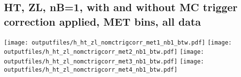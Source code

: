 \documentclass[11pt]{article}
\begin{document}














     \subsection{ HT, ZL, nB=1, with and without MC trigger correction applied, MET bins, all data}

    \noindent
     \texttt{[image: outputfiles/h\_ht\_zl\_nomctrigcorr\_met1\_nb1\_btw.pdf]}
     \texttt{[image: outputfiles/h\_ht\_zl\_nomctrigcorr\_met2\_nb1\_btw.pdf]}
     \texttt{[image: outputfiles/h\_ht\_zl\_nomctrigcorr\_met3\_nb1\_btw.pdf]}
     \texttt{[image: outputfiles/h\_ht\_zl\_nomctrigcorr\_met4\_nb1\_btw.pdf]}
\end{document}
